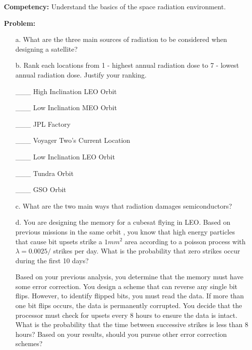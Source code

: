 \documentclass[12pt]{article}
\begin{document}
\begin{enumerate}
    \textbf{Competency:} Understand the basics of the space radiation environment.

    \textbf{Problem:} 

    \begin{enumerate}
        \item[a.] What are the three main sources of radiation to be considered when designing a satellite?
        
        \vspace{3cm}

        \item[b.] Rank each locations from 1 - highest annual radiation dose to 7 - lowest annual radiation dose. Justify your ranking.
        \vspace{0.5cm}

        \_\_\_ High Inclination LEO Orbit

        \_\_\_ Low Inclination MEO Orbit

        \_\_\_ JPL Factory

        \_\_\_ Voyager Two's Current Location

        \_\_\_ Low Inclination LEO Orbit

        \_\_\_ Tundra Orbit

        \_\_\_ GSO Orbit

        \vspace{3cm}

        \item[c.] What are the two main ways that radiation damages semiconductors?
        
        \newpage

        \item[d.] You are designing the memory for a cubesat flying in LEO. Based on previous missions in the same orbit ,
        you know that high energy particles that cause bit upsets strike a $1 mm^2$ area according to a poisson 
        process with $\lambda = 0.0025/$ strikes per day. What is the probability that zero strikes occur during the first
        10 days? 
        
        \vspace{3cm}

        Based on your previous analysis, you determine that the memory must have some error correction. You design a scheme that
        can reverse any single bit flips. However, to identify flipped bits, you must read the data. If more than one bit flips occurs,
        the data is permanently corrupted. You decide that the processor must check for upsets every 8 hours to ensure the data is intact.
        What is the probability that the time between successive strikes is less than 8 hours? Based on your results, should you pursue other error
        correction schemes?


\end{enumerate}
\end{enumerate}
\end{document}
